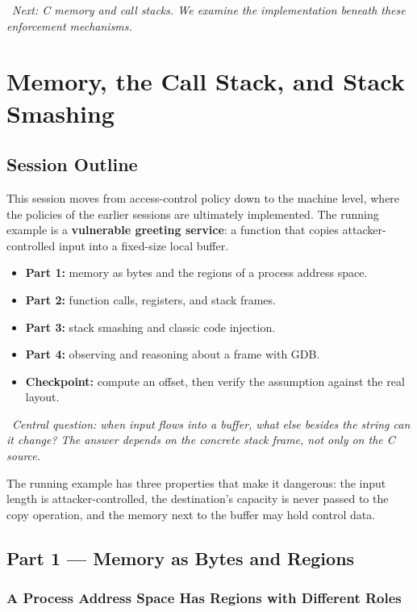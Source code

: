 \documentclass[hidelinks]{article}
\newcommand{\callout}[1]{\par\smallskip\noindent{\color{capri}$\blacktriangleright$}\ \textit{#1}\par\smallskip}
\begin{document}
\callout{Next: C memory and call stacks. We examine the implementation beneath these enforcement mechanisms.}

\newpage
\section{Memory, the Call Stack, and Stack Smashing}

\subsection{Session Outline}

This session moves from access-control policy down to the machine level, where the policies of the earlier sessions are ultimately implemented. The running example is a \textbf{vulnerable greeting service}: a function that copies attacker-controlled input into a fixed-size local buffer.
\begin{itemize}
    \item \textbf{Part 1:} memory as bytes and the regions of a process address space.
    \item \textbf{Part 2:} function calls, registers, and stack frames.
    \item \textbf{Part 3:} stack smashing and classic code injection.
    \item \textbf{Part 4:} observing and reasoning about a frame with GDB.
    \item \textbf{Checkpoint:} compute an offset, then verify the assumption against the real layout.
\end{itemize}

\callout{Central question: when input flows into a buffer, \emph{what else besides the string can it change?} The answer depends on the concrete stack frame, not only on the C source.}

The running example has three properties that make it dangerous: the input length is attacker-controlled, the destination's capacity is never passed to the copy operation, and the memory next to the buffer may hold control data.

\subsection{Part 1 --- Memory as Bytes and Regions}

\subsubsection{A Process Address Space Has Regions with Different Roles}
\end{document}
